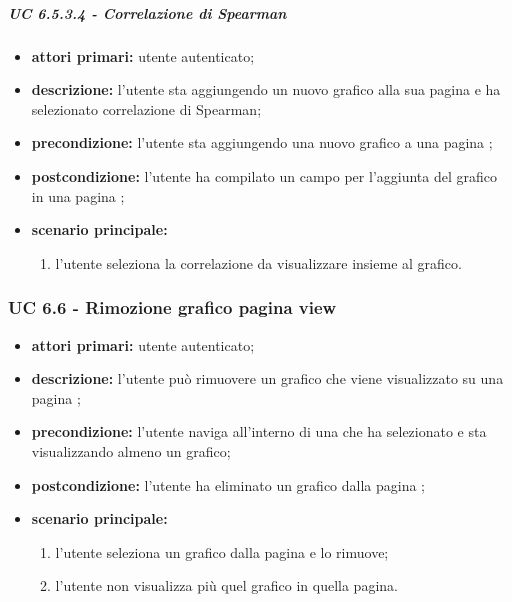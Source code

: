 			\subparagraph{UC 6.5.3.4 - Correlazione di Spearman}
			\begin{itemize}
				\item \textbf{attori primari:} utente autenticato;
				\item \textbf{descrizione:} l'utente sta aggiungendo un nuovo grafico alla sua pagina  e ha selezionato correlazione di Spearman;
				\item \textbf{precondizione:} l'utente sta aggiungendo una nuovo grafico a una pagina ;
				\item \textbf{postcondizione:} l'utente ha compilato un campo per l'aggiunta del grafico in una pagina ;
				\item \textbf{scenario principale:}
				\begin{enumerate}
					\item{l'utente seleziona la correlazione da visualizzare insieme al grafico.}
				\end{enumerate}
			\end{itemize}


			\subsubsection{UC 6.6 - Rimozione grafico pagina view}
			\begin{itemize}
				\item \textbf{attori primari:} utente autenticato;
				\item \textbf{descrizione:} l'utente può rimuovere un grafico che viene visualizzato su una pagina ;
				\item \textbf{precondizione:} l'utente naviga all'interno di una  che ha selezionato e sta visualizzando almeno un grafico;
				\item \textbf{postcondizione:} l'utente ha eliminato un grafico dalla pagina ;
				\item \textbf{scenario principale:}
				\begin{enumerate}
					\item{l'utente seleziona un grafico dalla pagina  e lo rimuove;}
					\item{l'utente non visualizza più quel grafico in quella pagina.}
				\end{enumerate}
			\end{itemize}
